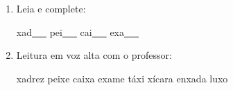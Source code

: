 \begin{exercicio}
\begin{enumerate}[resume]
\begin{enumerate}[label=(\alph*)]
    \item O som da unidade é: ( ) oral ( ) nasal 

    \item A primeira sílaba de XADREZ é: ( ) XA ( ) XE

    \item As palavras da unidade aparecem: ( ) no início ( ) no meio ( ) no fim das palavras

  \end{enumerate}

  \item Leia e complete:
  \begin{center}
  xad\underline{~~~} \quad pei\underline{~~~} \quad cai\underline{~~~} \quad exa\underline{~~~}
  \end{center}

  \item Leitura em voz alta com o professor:
  \begin{center}
  xadrez \quad peixe \quad caixa \quad exame \quad táxi \quad xícara \quad enxada \quad luxo
  \end{center}

\end{enumerate}

\end{exercicio}



